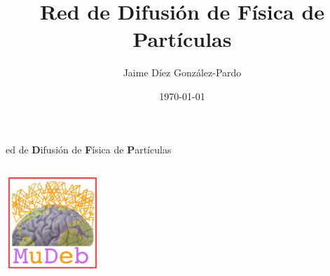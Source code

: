 \documentclass[xcolor=dvipsnames]{beamer}
\title[\textbf{MuDeb}]{Red de Difusión de Física de Partículas} %
\author[]{Jaime Díez González-Pardo } %
\institute[UC]{Universidad de Cantabria}
\date{ \today} %
\begin{document}
        \begingroup
            \makeatletter
            \setlength{\hoffset}{-.5\beamer@sidebarwidth}
            \makeatother
            \begin{frame}[plain]
                    \vspace{1cm}
                    \begin{center}
                       {\fontsize{35pt}{24pt}ed de {\color{Orchid} \textbf{D}}ifusión de {\color{Jaime} \textbf {F}}ísica de {\color{Orchid} \textbf{P}}artículas}
                    \end{center}
                    \vspace{1cm}

                \begin{columns}[onlytextwidth,T]
                    \column{\dimexpr\linewidth-35mm}%
                        
                        \normalsize
                        \vspace{0.75cm}
                            \insertauthor
                        \vspace{1cm}

                        \insertinstitute

                        \insertdate

                    \column{35mm}
                        \includegraphics[width=35mm]{../Fotos/Logo/logoTrans.png}

                \end{columns}
            \end{frame}
        \endgroup
\end{document}
